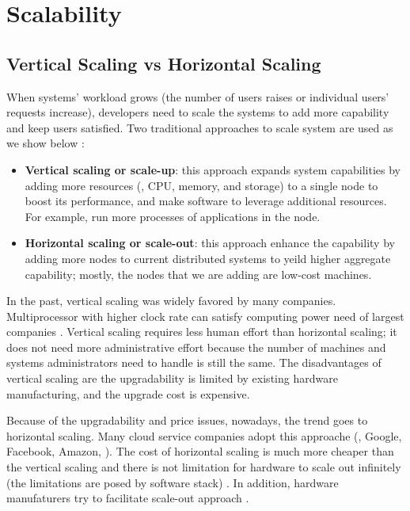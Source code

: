 \section{Scalability}
\label{bg-sc}

\subsection{Vertical Scaling vs Horizontal Scaling} 
\label{bg-sc-type}

When systems' workload grows (the number of users raises or individual users'
requests increase), developers need to scale the systems to add more capability
and keep users satisfied. Two traditional approaches to scale system are used as
we show below \cite{Michael+07-ScaleUpXScaleOut}:
\begin{itemize}

\item \textbf{Vertical scaling or scale-up}: this approach expands system
capabilities by adding more resources (\eg, CPU, memory, and storage) to a
single node to boost its performance, and make software to leverage additional
resources. For example, run more processes of applications in the node.

\item \textbf{Horizontal scaling or scale-out}: this approach enhance the
capability by adding more nodes to current distributed systems to yeild higher
aggregate capability; mostly, the nodes that we are adding are low-cost
machines.

\end{itemize}

In the past, vertical scaling was widely favored by many companies.
Multiprocessor with higher clock rate can satisfy computing power need of
largest companies \cite{Michael+07-ScaleUpXScaleOut}. Vertical scaling requires
less human effort than horizontal scaling; it does not need more administrative
effort because the number of machines and systems administrators need to handle
is still the same. The disadvantages of vertical scaling are the upgradability
is limited by existing hardware manufacturing, and the upgrade cost is
expensive.

Because of the upgradability and price issues, nowadays, the trend goes to
horizontal scaling. Many cloud service companies adopt this approache (\eg,
Google, Facebook, Amazon, \etc). The cost of horizontal scaling is much more
cheaper than the vertical scaling and there is not limitation for hardware to
scale out infinitely (the limitations are posed by software stack)
\cite{ScaleUpVsScaleOut}. In addition, hardware manufaturers try to facilitate
scale-out approach \cite{Michael+07-ScaleUpXScaleOut}.

